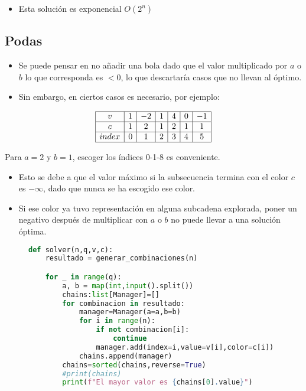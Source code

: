 \documentclass{article}
\begin{document}
\begin{itemize}
    \item Esta solución es exponencial $O(2^n)$
\end{itemize}

\subsection*{Podas}
\begin{itemize}
    \item Se puede pensar en no añadir una bola dado que el valor multiplicado por $a$ o $b$ lo que corresponda es $< 0$, lo que descartaría casos que no llevan al óptimo.
    \item Sin embargo, en ciertos casos es necesario, por ejemplo:
\end{itemize}

\[
\begin{array}{|c|c|c|c|c|c|c|}
\hline
v & 1 & -2 & 1 & 4 & 0 & -1 \\
\hline
c & 1 & 2 & 1 & 2 & 1 & 1 \\
\hline
index & 0 & 1 & 2 & 3 & 4 & 5 \\
\hline
\end{array}
\]

Para $a=2$ y $b=1$, escoger los índices 0-1-8 es conveniente.
\begin{itemize}
    \item Esto se debe a que el valor máximo si la subsecuencia termina con el color $c$ es $-\infty$, dado que nunca se ha escogido ese color.
    \item Si ese color ya tuvo representación en alguna subcadena explorada, poner un negativo después de multiplicar con $a$ o $b$ no puede llevar a una solución óptima.
\end{itemize}
\begin{figure}[H]
    \centering

\begin{lstlisting}[language=Python]
    def solver(n,q,v,c):
    resultado = generar_combinaciones(n)

    for _ in range(q):
        a, b = map(int,input().split())
        chains:list[Manager]=[]
        for combinacion in resultado:
            manager=Manager(a=a,b=b)
            for i in range(n):
                if not combinacion[i]:
                    continue
                manager.add(index=i,value=v[i],color=c[i])
            chains.append(manager)
        chains=sorted(chains,reverse=True)
        #print(chains)
        print(f"El mayor valor es {chains[0].value}")
    \end{lstlisting}
\end{figure}
\end{document}

